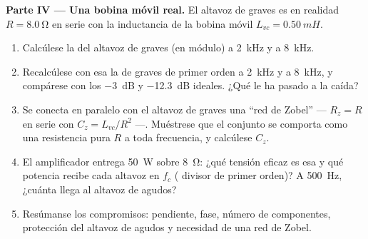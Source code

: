 \begin{problem}
\medskip
\noindent\textbf{Parte IV --- Una bobina móvil real.}
El altavoz de graves es en realidad $R = \qty{8.0}{\ohm}$ en serie con la
inductancia de la bobina móvil $L_{vc} = \qty{0.50}{mH}$.
\begin{enumerate}[resume]
  \item Calcúlese la  del altavoz de graves (en módulo) a
        \qty{2}{kHz} y a \qty{8}{kHz}.
  \item Recalcúlese con esa  la  de graves de primer
        orden a \qty{2}{kHz} y a \qty{8}{kHz}, y compárese con los
        \qty{-3}{dB} y \qty{-12.3}{dB} ideales. ¿Qué le ha pasado a la
        caída?
  \item Se conecta en paralelo con el altavoz de graves una ``red de
        Zobel'' --- $R_z = R$ en serie con $C_z =
        L_{vc}/R^2$ ---. Muéstrese que el conjunto se comporta como una
        resistencia pura $R$ a toda frecuencia, y calcúlese $C_z$.
  \item El amplificador entrega \qty{50}{W} sobre \qty{8}{\ohm}: ¿qué
        tensión eficaz es esa y qué potencia recibe cada altavoz en $f_c$
        ( divisor de primer orden)? A \qty{500}{Hz}, ¿cuánta llega
        al altavoz de agudos?
  \item Resúmanse los compromisos: pendiente, fase, número de componentes,
        protección del altavoz de agudos y necesidad de una red de Zobel.
\end{enumerate}
\end{problem}
